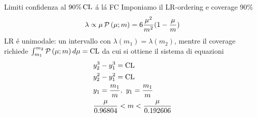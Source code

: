 \begin{frame}{Limiti confidenza al $90\%\operatorname{CL}$ \'a l\'a FC}
Imponiamo il LR-ordering e coverage $90\%$
\begin{equation*}
\lambda\propto\mu\operatorname{\mathcal{P}}{(\mu;m)}=6\frac{\mu^2}{m^2}(1-\frac{\mu}{m})
\end{equation*}
LR \'e unimodale: un intervallo con $\lambda(m_1)=\lambda(m_2)$, mentre il coverage richiede $\int_{m_1}^{m_2}\operatorname{\mathcal{P}}{(\mu;m)}\,d\mu=\operatorname{CL}$ da cui si ottiene il sistema di equazioni
\begin{align*}
&y_2^3-y_1^3=\operatorname{CL}\\
&y_2^2-y_1^2=\operatorname{CL}\\
&y_1=\frac{m_1}{m},\ y_1=\frac{m_1}{m}\\
&\frac{\mu}{0.96804}<m<\frac{\mu}{0.192606}
\end{align*}
\end{frame}

